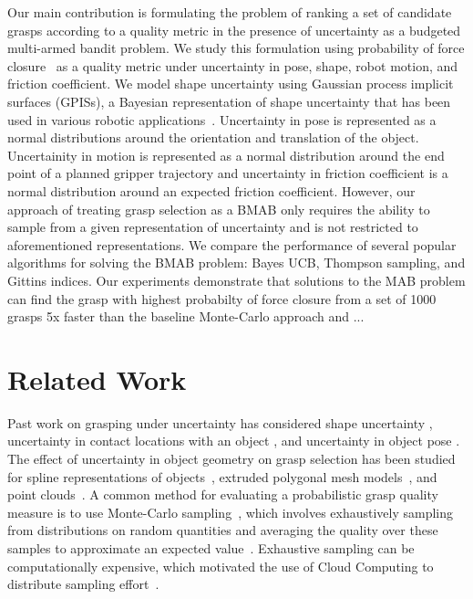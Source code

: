\documentclass[journal,transmag]{IEEEtran}%
\begin{document}
Our main contribution is formulating the problem of ranking a set of candidate grasps according to a quality metric in the presence of uncertainty as a budgeted multi-armed bandit problem. %
We study this formulation using probability of force closure~\cite{christopoulos2007handling, weisz2012pose, kehoe2012toward} as a quality metric under uncertainty in pose, shape, robot motion, and friction coefficient. 
We model shape uncertainty using Gaussian process implicit surfaces (GPISs), a Bayesian representation of shape uncertainty that has been used in various robotic applications~\cite{dragiev2011, hollinger2013}. 
Uncertainty in pose is represented as a normal distributions around the orientation and translation of the object.
Uncertainity in motion is represented as a normal distribution around the end point of a planned gripper trajectory and uncertainty in friction coefficient is a normal distribution around an expected friction coefficient.
However, our approach of treating grasp selection as a BMAB only requires the ability to sample from a given representation of uncertainty and is not restricted to aforementioned representations.
We compare the performance of several popular algorithms for solving the BMAB problem: Bayes UCB, Thompson sampling, and Gittins indices.
Our experiments demonstrate that solutions to the MAB problem can find the grasp with highest probabilty of force closure from a set of 1000 grasps 5x faster than the baseline Monte-Carlo approach and ...

\section{Related Work}

Past work on grasping under uncertainty has considered shape uncertainty \cite{goldberg1990bayesian, stulp2011learning}, uncertainty in contact locations with an object \cite{zheng2005}, and uncertainty in object pose \cite{christopoulos2007handling, weisz2012pose, kim2012physically}.
The effect of uncertainty in object geometry on grasp selection has been studied for spline representations of objects~\cite{christopoulos2007handling}, extruded polygonal mesh models~\cite{kehoe2012estimating, kehoe2012toward}, and point clouds~\cite{hsiao2011bayesian}.
A common method for evaluating a probabilistic grasp quality measure is to use Monte-Carlo sampling~\cite{christopoulos2007handling, kehoe2012estimating, kehoe2012toward}, which involves exhaustively sampling from distributions on random quantities and averaging the quality over these samples to approximate an expected value~\cite{caflisch1998monte}.
Exhaustive sampling can be computationally expensive, which motivated the use of Cloud Computing to distribute sampling effort~\cite{kehoe2012toward}.
\end{document}
